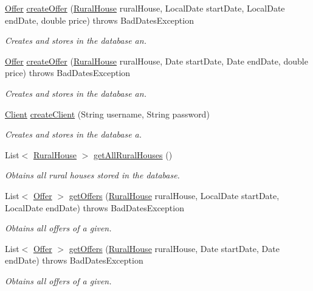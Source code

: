 \begin{DoxyCompactItemize}
\mbox{\hyperlink{a00184}{Offer}} \mbox{\hyperlink{a00132_acbf81cc6dc4bf9adf9ea7a85751edfc0}{create\+Offer}} (\mbox{\hyperlink{a00188}{Rural\+House}} rural\+House, Local\+Date start\+Date, Local\+Date end\+Date, double price)  throws Bad\+Dates\+Exception 
\begin{DoxyCompactList}\small\item\em Creates and stores in the database an. \end{DoxyCompactList}\item 
\mbox{\hyperlink{a00184}{Offer}} \mbox{\hyperlink{a00132_a9aafb2ac6e91d643bc5dd1f5691d4075}{create\+Offer}} (\mbox{\hyperlink{a00188}{Rural\+House}} rural\+House, Date start\+Date, Date end\+Date, double price)  throws Bad\+Dates\+Exception 
\begin{DoxyCompactList}\small\item\em Creates and stores in the database an. \end{DoxyCompactList}\item 
\mbox{\hyperlink{a00164}{Client}} \mbox{\hyperlink{a00132_ae48e63f3df5226e46e4a57a64d120823}{create\+Client}} (String username, String password)
\begin{DoxyCompactList}\small\item\em Creates and stores in the database a. \end{DoxyCompactList}\item 
List$<$ \mbox{\hyperlink{a00188}{Rural\+House}} $>$ \mbox{\hyperlink{a00132_a22bb7d4b98f51470315a81cd0d6f2290}{get\+All\+Rural\+Houses}} ()
\begin{DoxyCompactList}\small\item\em Obtains all rural houses stored in the database. \end{DoxyCompactList}\item 
List$<$ \mbox{\hyperlink{a00184}{Offer}} $>$ \mbox{\hyperlink{a00132_a131acc04c80b3860f98d713d3a8ea5a5}{get\+Offers}} (\mbox{\hyperlink{a00188}{Rural\+House}} rural\+House, Local\+Date start\+Date, Local\+Date end\+Date)  throws Bad\+Dates\+Exception 
\begin{DoxyCompactList}\small\item\em Obtains all offers of a given. \end{DoxyCompactList}\item 
List$<$ \mbox{\hyperlink{a00184}{Offer}} $>$ \mbox{\hyperlink{a00132_a178d3964ff871edce1f5a207331319ed}{get\+Offers}} (\mbox{\hyperlink{a00188}{Rural\+House}} rural\+House, Date start\+Date, Date end\+Date)  throws Bad\+Dates\+Exception 
\begin{DoxyCompactList}\small\item\em Obtains all offers of a given. \end{DoxyCompactList}\item 

\end{DoxyCompactItemize}
